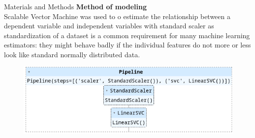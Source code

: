 \begin{frame}{Materials and Methods}
    \textbf{Method of modeling}\\
    \vspace{2em}
    Scalable Vector Machine was used to o estimate the relationship between a dependent variable and independent variables with standard scaler as standardization of a dataset is a common requirement for many machine learning estimators: they might behave badly if the individual features do not more or less look like standard normally distributed data.
    
    \begin{figure}[H]
        \includegraphics[width=\textwidth]{pipeline}
    \end{figure}
\end{frame}
